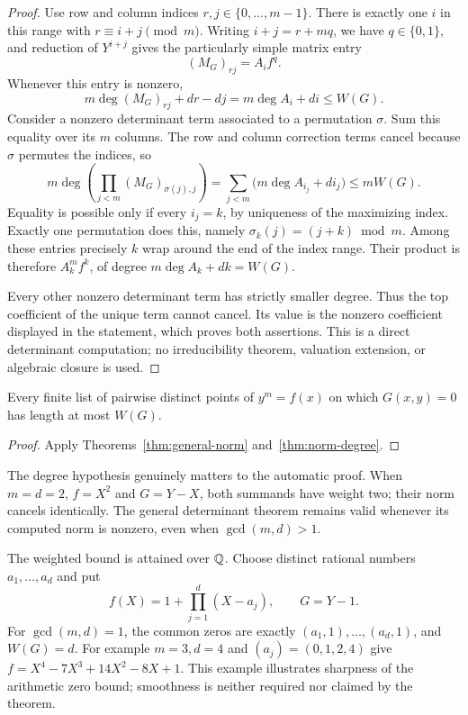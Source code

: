 \begin{proof}
Use row and column indices $r,j\in\{0,\ldots,m-1\}$. There is
exactly one $i$ in this range with $r\equiv i+j\pmod m$.
Writing $i+j=r+mq$, we have $q\in\{0,1\}$, and reduction of
$Y^{i+j}$ gives the particularly simple matrix entry
\[
                       (M_G)_{rj}=A_i f^q.
\]
Whenever this entry is nonzero,
\[
       m\deg (M_G)_{rj}+d r-d j
            =m\deg A_i+d i\leq W(G).
\]
Consider a nonzero determinant term associated to a permutation
$\sigma$. Sum this equality over its $m$ columns. The row and
column correction terms cancel because $\sigma$ permutes the
indices, so
\[
 m\deg\left(\prod_{j<m}(M_G)_{\sigma(j),j}\right)
       =\sum_{j<m}\bigl(m\deg A_{i_j}+d i_j\bigr)
       \leq mW(G).
\]
Equality is possible only if every $i_j=k$, by uniqueness of the
maximizing index. Exactly one permutation does this, namely
$\sigma_k(j)=(j+k)\bmod m$. Among these entries precisely $k$
wrap around the end of the index range. Their product is therefore
$A_k^m f^k$, of degree $m\deg A_k+dk=W(G)$.

Every other nonzero determinant term has strictly smaller degree.
Thus the top coefficient of the unique term cannot cancel. Its
value is the nonzero coefficient displayed in the statement, which
proves both assertions. This is a direct determinant computation;
no irreducibility theorem, valuation extension, or algebraic closure
is used.
\end{proof}

\begin{corollary}\label{cor:norm-zeros}
Every finite list of pairwise distinct points of $y^m=f(x)$ on
which $G(x,y)=0$ has length at most $W(G)$.
\end{corollary}
\begin{proof}
Apply Theorems~\ref{thm:general-norm} and~\ref{thm:norm-degree}.
\end{proof}

The degree hypothesis genuinely matters to the automatic proof.
When $m=d=2$, $f=X^2$ and $G=Y-X$, both summands have weight two;
their norm cancels identically. The general determinant theorem
remains valid whenever its computed norm is nonzero, even when
$\gcd(m,d)>1$.

The weighted bound is attained over $\mathbb Q$. Choose distinct rational
numbers $a_1,\ldots,a_d$ and put
\[
           f(X)=1+\prod_{j=1}^d(X-a_j),\qquad G=Y-1.
\]
For $\gcd(m,d)=1$, the common zeros are exactly
$(a_1,1),\ldots,(a_d,1)$, and $W(G)=d$. For example $m=3,d=4$
and $(a_j)=(0,1,2,4)$ give
$f=X^4-7X^3+14X^2-8X+1$. This example illustrates sharpness of
the arithmetic zero bound; smoothness is neither required nor
claimed by the theorem.

